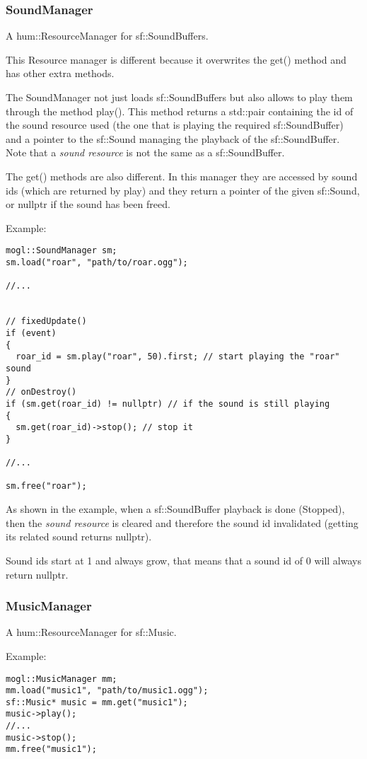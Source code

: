 \subsubsection{SoundManager}

A hum::ResourceManager for sf::SoundBuffers.

This Resource manager is different because it overwrites the get() method and
has other extra methods.

The SoundManager not just loads sf::SoundBuffers but also allows to play them
through the method play(). This method returns a std::pair containing the
id of the sound resource used (the one that is playing the required
sf::SoundBuffer) and a pointer to the sf::Sound managing the playback of the
sf::SoundBuffer. Note that a \textit{sound resource} is not the same as a sf::SoundBuffer.

The get() methods are also different. In this manager they are accessed by
sound ids (which are returned by play) and they return a pointer of the given
sf::Sound, or nullptr if the sound has been freed.

Example:
\begin{lstlisting}[caption= SoundManager example]
mogl::SoundManager sm;
sm.load("roar", "path/to/roar.ogg");

//...


// fixedUpdate()
if (event)
{
  roar_id = sm.play("roar", 50).first; // start playing the "roar" sound
}
// onDestroy()
if (sm.get(roar_id) != nullptr) // if the sound is still playing
{
  sm.get(roar_id)->stop(); // stop it
}

//...

sm.free("roar");
\end{lstlisting}

As shown in the example, when a sf::SoundBuffer playback is done (Stopped),
then the \textit{sound resource} is cleared and therefore the sound id invalidated
(getting its related sound returns nullptr).

Sound ids start at 1 and always grow, that means that a sound id of 0 will
always return nullptr.

\subsubsection{MusicManager}

A hum::ResourceManager for sf::Music.

Example:
\begin{lstlisting}[caption=MusicManager example]
mogl::MusicManager mm;
mm.load("music1", "path/to/music1.ogg");
sf::Music* music = mm.get("music1");
music->play();
//...
music->stop();
mm.free("music1");
\end{lstlisting}

